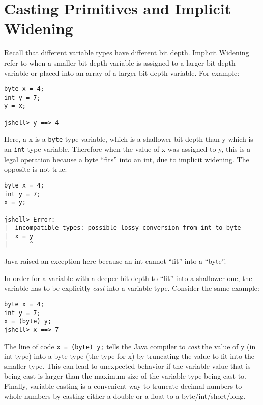 \documentclass{tufte-handout}
\begin{document}
    \section*{Casting Primitives and Implicit Widening}
    Recall that different variable types have different bit depth. Implicit Widening refer to when a smaller bit depth variable is assigned to a larger bit depth variable or placed into an array of a larger bit depth variable. For example:
    \begin{lstlisting}
byte x = 4;
int y = 7;
y = x;

jshell> y ==> 4
    \end{lstlisting}
    Here, a x is a \texttt{byte} type variable, which is a shallower bit depth than y which is an \texttt{int} type variable. Therefore when the value of x was assigned to y, this is a legal operation because a byte ``fits'' into an int, due to implicit widening. The opposite is not true:
    \begin{lstlisting}
byte x = 4;
int y = 7;
x = y;

jshell> Error:
|  incompatible types: possible lossy conversion from int to byte
|  x = y
|      ^     
    \end{lstlisting}
    Java raised an exception here because an int cannot ``fit'' into a ``byte''.

    In order for a variable with a deeper bit depth to ``fit'' into a shallower one, the variable has to be explicitly \emph{cast} into a variable type. Consider the same example:
    \begin{lstlisting}
byte x = 4;
int y = 7;
x = (byte) y;
jshell> x ==> 7    
    \end{lstlisting}
    The line of code \texttt{x = (byte) y;} tells the Java compiler to \emph{cast} the value of y (in int type) into a byte type (the type for x) by truncating the value to fit into the smaller type. This can lead to unexpected behavior if the variable value that is being cast is larger than the maximum size of the variable type being cast to. Finally, variable casting is a convenient way to truncate decimal numbers to whole numbers by casting either a double or a float to a byte/int/short/long.
\end{document}
